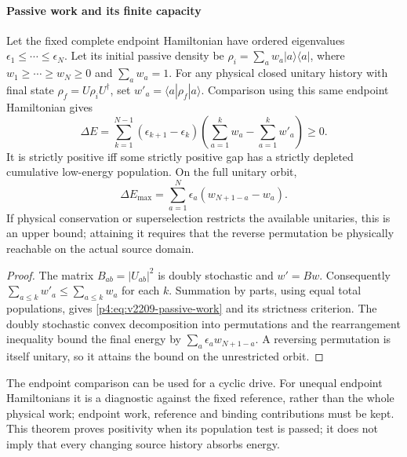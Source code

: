 \documentclass[12pt,a4paper]{article}
\begin{document}
\paragraph{Passive work and its finite capacity}
\begin{theorem}
\label{p4:thm:v2209-passive-work-capacity}
Let the fixed complete endpoint Hamiltonian have ordered eigenvalues
\(\epsilon_1\le\cdots\le\epsilon_N\). Let its initial passive density be
\(\rho_i=\sum_a w_a|a\rangle\langle a|\), where
\(w_1\ge\cdots\ge w_N\ge0\) and \(\sum_a w_a=1\).
For any physical closed unitary history with final state
\(\rho_f=U\rho_iU^\dagger\), set \(w'_a=\langle a|\rho_f|a\rangle\).
Comparison using this same endpoint Hamiltonian gives
\begin{equation}
\label{p4:eq:v2209-passive-work}
 \Delta E=\sum_{k=1}^{N-1}(\epsilon_{k+1}-\epsilon_k)
 \left(\sum_{a=1}^kw_a-\sum_{a=1}^kw'_a\right)\ge0.
\end{equation}
It is strictly positive iff some strictly positive gap has a strictly
depleted cumulative low-energy population. On the full unitary orbit,
\begin{equation}
\label{p4:eq:v2209-passive-capacity}
 \Delta E_{\max}=\sum_{a=1}^N\epsilon_a(w_{N+1-a}-w_a).
\end{equation}
If physical conservation or superselection restricts the available
unitaries, this is an upper bound; attaining it requires that the reverse
permutation be physically reachable on the actual source domain.
\end{theorem}
\begin{proof}
The matrix \(B_{ab}=|U_{ab}|^2\) is doubly stochastic and \(w'=Bw\).
Consequently \(\sum_{a\le k}w'_a\le\sum_{a\le k}w_a\) for each \(k\).
Summation by parts, using equal total populations, gives
\eqref{p4:eq:v2209-passive-work} and its strictness criterion.
The doubly stochastic convex decomposition into permutations and the
rearrangement inequality bound the final energy by
\(\sum_a\epsilon_aw_{N+1-a}\). A reversing permutation is itself unitary,
so it attains the bound on the unrestricted orbit.
\end{proof}
The endpoint comparison can be used for a cyclic drive. For unequal endpoint
Hamiltonians it is a diagnostic against the fixed reference, rather than the
whole physical work; endpoint work, reference and binding contributions must
be kept. This theorem proves positivity when its population test is passed;
it does not imply that every changing source history absorbs energy.
\end{document}
